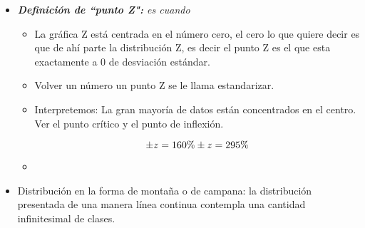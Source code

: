\begin{itemize}
    \item \emph{\textbf{Definición de ``punto Z":} es cuando }
        \begin{itemize}
            \item La gráfica Z está centrada en el número cero, el cero lo que quiere decir es que de ahí parte la distribución Z, es decir el punto Z es el que esta exactamente a 0 de desviación estándar.
            \item Volver un número un punto Z se le llama estandarizar. 
            \item Interpretemos: La gran mayoría de datos están concentrados en el centro. Ver el punto crítico y el punto de inflexión.
                \begin{figure}[htbp]
                    \centering
                    \caption{}
                    \label{}
                \end{figure}
                \[
                  \pm z = 1 60\% \\ 
                  \pm z = 2 95\% \\ 
                \]
            
            \item 
        \end{itemize}
    \item Distribución en la forma de montaña o de campana: la distribución presentada de una manera línea continua contempla una cantidad infinitesimal de clases.
\end{itemize}
